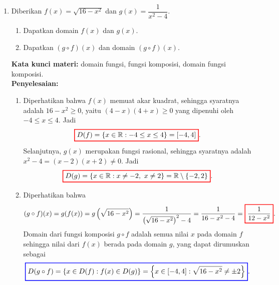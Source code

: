 \documentclass[10pt,openany,a4paper]{article}
\theoremstyle{definition}
\theoremstyle{definition}
\theoremstyle{plain}
\newenvironment{jawab}[2][tes]{%
\par\noindent\textbf{Kata kunci materi:} #1.\\
\textbf{Penyelesaian:} #2%
}{}
\begin{document}
\begin{enumerate}
    \item Diberikan $f(x)=\sqrt{16-x^2}$ dan $g(x)=\dfrac{1}{x^2-4}$.
    \begin{enumerate}
        \item Dapatkan domain $f(x)$ dan $g(x)$.
        \item Dapatkan $(g\circ f)(x)$ dan domain $(g\circ f)(x)$.
    \end{enumerate}
    \begin{jawab}[domain fungsi, fungsi komposisi, domain fungsi komposisi]{
        \begin{enumerate}
            \item Diperhatikan bahwa $f(x)$ memuat akar kuadrat, sehingga syaratnya adalah $16-x^2\geq 0$, yaitu $(4-x)(4+x)\geq 0$ yang dipenuhi oleh $-4\leq x\leq 4$. Jadi
            \begin{align*}
                \colorlet{oldcolor}{.}
        \color{red}
        \setlength{\fboxrule}{1pt} \boxed{\color{oldcolor}D(f)=\{x\in\mathbb{R} : -4\leq x\leq 4\}=[-4,4]}\color{oldcolor}.
            \end{align*}
            Selanjutnya, $g(x)$ merupakan fungsi rasional, sehingga syaratnya adalah $x^2-4=(x-2)(x+2)\neq 0$. Jadi
            \begin{align*}
                \colorlet{oldcolor}{.}
        \color{red}
        \setlength{\fboxrule}{1pt} \boxed{\color{oldcolor}D(g)=\{x\in\mathbb{R} : x\neq -2,~x\neq 2\}=\mathbb{R}\setminus\{-2,2\}}\color{oldcolor}.
            \end{align*}
            \item Diperhatikan bahwa
            \begin{align*}
                (g\circ f)(x) = g(f(x)) = g\left(\sqrt{16-x^2}\right) = \frac{1}{\left(\sqrt{16-x^2}\right)^2-4} = \frac{1}{16-x^2-4} = \colorlet{oldcolor}{.}
        \color{red}
        \setlength{\fboxrule}{1pt} \boxed{\color{oldcolor}\frac{1}{12-x^2}}\color{oldcolor}.
            \end{align*}
            Domain dari fungsi komposisi $g\circ f$ adalah semua nilai $x$ pada domain $f$ sehingga nilai dari $f(x)$ berada pada domain $g$, yang dapat dirumuskan sebagai
            \begin{align*}
                \colorlet{oldcolor}{.}
        \color{blue}
        \setlength{\fboxrule}{1pt} \boxed{\color{oldcolor}D(g\circ f) = \{x \in D(f) : f(x) \in D(g)\} = \left\{x \in [-4,4] : \sqrt{16-x^2} \neq \pm 2\right\}}\color{oldcolor}.
            \end{align*}

\end{enumerate}}
\end{jawab}
\end{enumerate}
\end{document}
